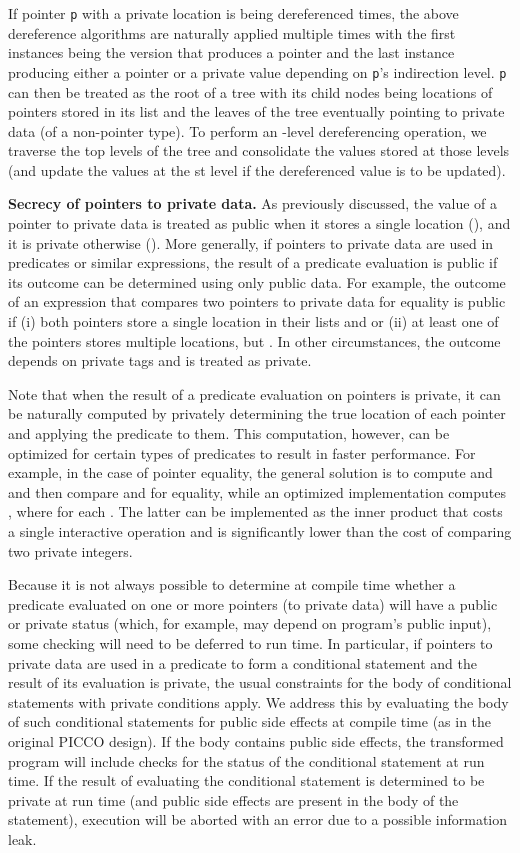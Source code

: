 \documentclass[11pt]{article}
\begin{document}
If pointer \texttt{p} with a private location is being dereferenced 
times, the above dereference algorithms are naturally applied multiple times
with the first  instances being the version that produces a pointer and
the last instance producing either a pointer or a private value depending on
\texttt{p}'s indirection level. \texttt{p} can then be treated as the root
of a tree with its child nodes being locations of pointers stored in its
list and the leaves of the tree eventually pointing to private data (of a
non-pointer type). To perform an -level dereferencing operation, we
traverse the top  levels of the tree and consolidate the values stored
at those levels (and update the values at the st level if the
dereferenced value is to be updated). 

\medskip \noindent \textbf{Secrecy of pointers to private data.} As previously
discussed, the value of a pointer to private data is treated as public when
it stores a single location (), and it is private otherwise
(). More generally, if pointers to private data are used in
predicates or similar expressions, the result of a predicate evaluation is
public if its outcome can be determined using only public data. For example,
the outcome of an expression that compares two pointers to private data for
equality is public if (i) both pointers store a single location in their
lists  and  or (ii) at least one of the pointers stores multiple
locations, but . In other circumstances, the
outcome depends on private tags and is treated as private.

Note that when the result of a predicate evaluation on pointers is private,
it can be naturally computed by privately determining the true location of
each pointer and applying the predicate to them. This computation, however,
can be optimized for certain types of predicates to result in faster
performance. For example, in the case of pointer equality, the general
solution is to compute  and  and then compare  and  for equality, while
an optimized implementation computes , where  for each
. The latter can be implemented as the inner
product that costs a single interactive operation and is significantly lower
than the cost of comparing two private integers.

Because it is not always possible to determine at compile time whether a
predicate evaluated on one or more pointers (to private data) will have a
public or private status (which, for example, may depend on program's public
input), some checking will need to be deferred to run time. In particular,
if pointers to private data are used in a predicate to form a conditional
statement and the result of its evaluation is private, the usual constraints
for the body of conditional statements with private conditions apply. We
address this by evaluating the body of such conditional statements for
public side effects at compile time (as in the original PICCO design). If
the body contains public side effects, the transformed program will include
checks for the status of the conditional statement at run time. If the
result of evaluating the conditional statement is determined to be private
at run time (and public side effects are present in the body of the
statement), execution will be aborted with an error due to a possible
information leak.
\end{document}
